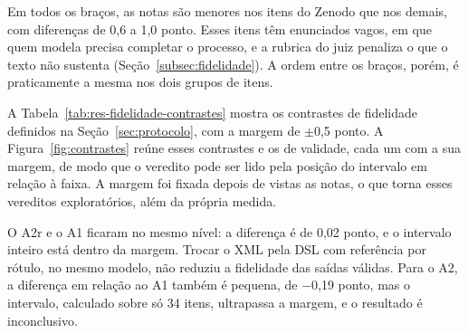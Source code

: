 Em todos os braços, as notas são menores nos itens do Zenodo que nos demais, com diferenças de 0,6 a 1,0 ponto. Esses itens têm enunciados vagos, em que quem modela precisa completar o processo, e a rubrica do juiz penaliza o que o texto não sustenta (Seção~\ref{subsec:fidelidade}). A ordem entre os braços, porém, é praticamente a mesma nos dois grupos de itens.

A Tabela~\ref{tab:res-fidelidade-contrastes} mostra os contrastes de fidelidade definidos na Seção~\ref{sec:protocolo}, com a margem de $\pm$0,5 ponto. A Figura~\ref{fig:contrastes} reúne esses contrastes e os de validade, cada um com a sua margem, de modo que o veredito pode ser lido pela posição do intervalo em relação à faixa. A margem foi fixada depois de vistas as notas, o que torna esses vereditos exploratórios, além da própria medida.

\begin{table}[htb]
\end{table}

O A2r e o A1 ficaram no mesmo nível: a diferença é de 0,02 ponto, e o intervalo inteiro está dentro da margem. Trocar o XML pela DSL com referência por rótulo, no mesmo modelo, não reduziu a fidelidade das saídas válidas. Para o A2, a diferença em relação ao A1 também é pequena, de $-$0,19 ponto, mas o intervalo, calculado sobre só 34 itens, ultrapassa a margem, e o resultado é inconclusivo.

